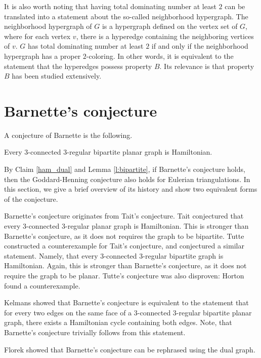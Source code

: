It is also worth noting that having total dominating number at least $2$ can be
translated into a statement about the so-called neighborhood hypergraph. The neighborhood
hypergraph of $G$ is a hypergraph defined on the vertex set of $G$, where for each vertex
$v$, there is a hyperedge containing the neighboring vertices of $v$. $G$ has total
dominating number at least $2$ if and only if the neighborhood hypergraph has a
proper $2$-coloring. In other words,
it is equivalent to the statement that the hyperedges possess property $B$. Its relevance
is that property $B$ has been studied extensively.

\section{Barnette's conjecture}

A conjecture of Barnette \cite{barnette} is the following.
\begin{conj}
  Every $3$-connected $3$-regular bipartite planar graph is Hamiltonian.
\end{conj}

By Claim \ref{ham_dual} and Lemma \ref{l:bipartite}, if Barnette's conjecture holds, then the Goddard-Henning
conjecture also holds for Eulerian triangulations. In this section, we give a brief
overview of its history and show two equivalent forms of the conjecture.

Barnette's conjecture originates from Tait's conjecture. Tait \cite{tait} conjectured
that every $3$-connected $3$-regular planar graph is Hamiltonian. This is stronger
than Barnette's conjecture, as it does not requires the graph to be bipartite. Tutte \cite{tutte} constructed a
counterexample for Tait's conjecture, and conjectured a similar statement. Namely, that every
$3$-connected $3$-regular bipartite graph is Hamiltonian. Again, this is stronger than
Barnette's conjecture, as it does not require the graph to be planar. Tutte's conjecture was
also disproven: Horton \cite{horton} found a counterexample.

Kelmans \cite{kelmans} showed that Barnette's conjecture is equivalent to the statement that
for every two edges on the same face of a $3$-connected $3$-regular bipartite planar graph,
there exists a Hamiltonian cycle containing both edges. Note, that Barnette's conjecture
trivially follows from this statement.

Florek \cite{florek} showed that Barnette's conjecture can be rephrased using the dual graph.
Namely, the following statement is equivalent with Barnette's conjecture. The vertices
of the dual of every $3$-connected $3$-regular bipartite planar graph can be partitioned
into two subsets whose induced subgraphs are trees.
